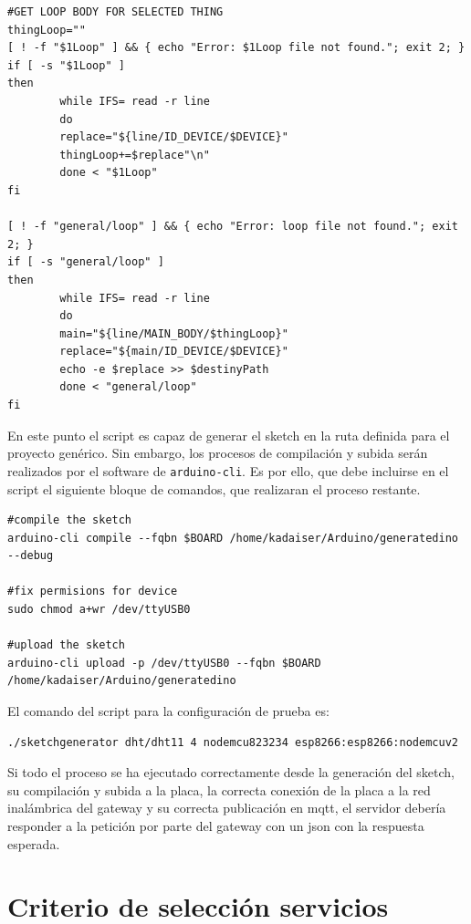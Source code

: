 \begin{verbatim}
#GET LOOP BODY FOR SELECTED THING
thingLoop=""
[ ! -f "$1Loop" ] && { echo "Error: $1Loop file not found."; exit 2; }
if [ -s "$1Loop" ]
then
        while IFS= read -r line
        do
        replace="${line/ID_DEVICE/$DEVICE}"
        thingLoop+=$replace"\n"
        done < "$1Loop"
fi

[ ! -f "general/loop" ] && { echo "Error: loop file not found."; exit 2; }
if [ -s "general/loop" ]
then
        while IFS= read -r line
        do
        main="${line/MAIN_BODY/$thingLoop}"
        replace="${main/ID_DEVICE/$DEVICE}"
        echo -e $replace >> $destinyPath
        done < "general/loop"
fi

\end{verbatim}

En este punto el \gls{script} es capaz de generar el sketch en la ruta definida para el proyecto genérico. Sin embargo, los procesos de compilación y subida serán realizados por el software de \verb|arduino-cli|. Es por ello, que debe incluirse en el \gls{script} el siguiente bloque de comandos, que realizaran el proceso restante.

\begin{verbatim}
#compile the sketch
arduino-cli compile --fqbn $BOARD /home/kadaiser/Arduino/generatedino --debug

#fix permisions for device
sudo chmod a+wr /dev/ttyUSB0

#upload the sketch
arduino-cli upload -p /dev/ttyUSB0 --fqbn $BOARD /home/kadaiser/Arduino/generatedino
\end{verbatim}

El comando del \gls{script} para la configuración de prueba es:
\begin{verbatim}
./sketchgenerator dht/dht11 4 nodemcu823234 esp8266:esp8266:nodemcuv2
\end{verbatim}

Si todo el proceso se ha ejecutado correctamente desde la generación del sketch, su compilación y subida a la placa, la correcta conexión de la placa a la red inalámbrica del \gls{gateway} y su correcta publicación en \gls{mqtt}, el servidor debería responder a la petición por parte del \gls{gateway} con un \gls{json} con la respuesta esperada.

\section{Criterio de selección servicios}
\label{ch:Capitulo4.4}

